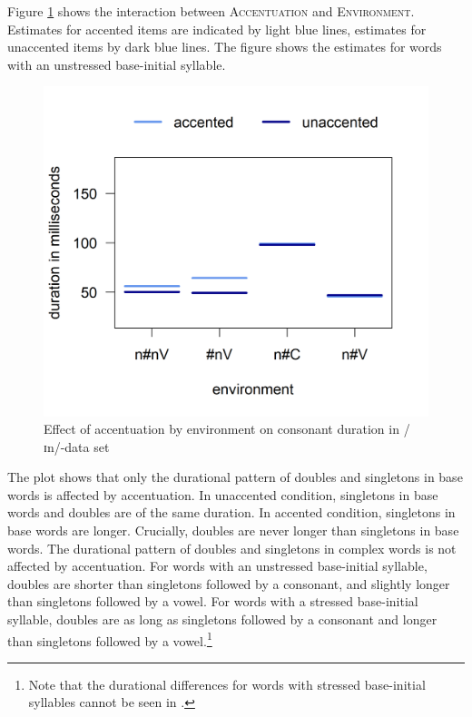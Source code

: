 Figure \ref{fig:Env Acc In complete experiment} shows the interaction between \textsc{Accentuation} and \textsc{Environment}. Estimates for accented items are indicated by light blue lines, estimates for unaccented items by dark blue lines. The figure shows the estimates for words with an unstressed base-initial syllable. 


	\begin{figure}[h!]
		\centering
		\vspace*{-0.3cm}
		\includegraphics [scale=0.5] {images/Experiment/InModelCompleteInterEnvAcc}
		\caption{Effect of accentuation by environment on consonant duration in /ɪn/-data set}
		\label{fig:Env Acc In complete experiment}
	\end{figure}


The plot shows that only the durational pattern of doubles and singletons in base words is affected by accentuation. 
In unaccented condition, singletons in base words and doubles are of the same duration. In accented condition, singletons in base words are longer. Crucially, doubles are never longer than singletons in base words.
The durational pattern of doubles and singletons in complex words is not affected by accentuation. For words with an unstressed base-initial syllable, doubles are shorter than singletons followed by a consonant, and slightly longer than singletons followed by a vowel. For words with a stressed base-initial syllable, doubles are as long as singletons followed by a consonant and longer than singletons followed by a vowel.\footnote{Note that the durational differences for words with stressed base-initial syllables cannot be seen in .} 


